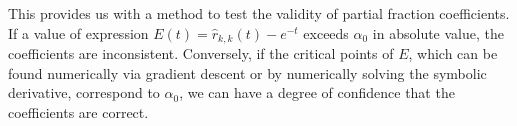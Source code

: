 This provides us with a method to test the validity of partial fraction
coefficients. If a value of expression $E(t) = \hat{r}_{k,k}(t) - e^{-t}$
exceeds $\alpha_0$ in absolute value, the coefficients are inconsistent.
Conversely, if the critical points of $E$, which can be found numerically via
gradient descent or by numerically solving the symbolic derivative, correspond
to $\alpha_0$, we can have a degree of confidence that the coefficients are
correct.

